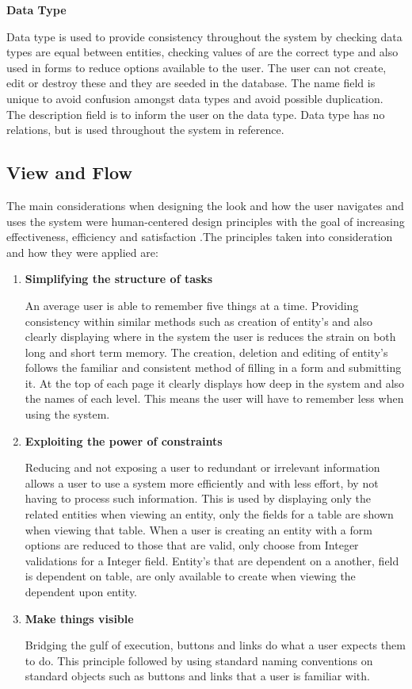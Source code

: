 \documentclass[a4paper,12pt]{article}
\begin{document}
\vspace{3mm}
\par \textbf{Data Type}
\par Data type is used to provide consistency throughout the system by checking data types are equal between entities, checking values of are the correct type and also used in forms to reduce options available to the user. The user can not create, edit or destroy these and they are seeded in the database. The name field is unique to avoid confusion amongst data types and avoid possible duplication. The description field is to inform the user on the data type. Data  type has no relations, but is used throughout the system in reference.


\subsection{View and Flow}
\par The main considerations when designing the look and how the user navigates and uses the system were human-centered design principles with the goal of increasing effectiveness, efficiency and satisfaction\cite{maguire2001methods} .The principles taken into consideration and how they were applied are\cite{abras2004user}:
\vspace{3mm}
\begin{enumerate}
\item \textbf{Simplifying the structure of tasks}
\par An average user is able to remember five things at a time. Providing consistency within similar methods such as creation of entity's and also clearly displaying where in the system the user is reduces the strain on both long and short term memory. The creation, deletion and editing of entity's follows the familiar and consistent method of filling in a form and submitting it. At the top of each page it clearly displays how deep in the system and also the names of each level. This means the user will have to remember less when using the system.
\item \textbf{Exploiting the power of constraints}
\par Reducing and not exposing a user to redundant or irrelevant information allows a user to use a system more efficiently and with less effort, by not having to process such information. This is used by displaying only the related entities when viewing an entity, only the fields for a table are shown when viewing that table. When a user is creating an entity with a form options are reduced to those that are valid, only choose from Integer validations for a Integer field. Entity's that are dependent on a another, field is dependent on table, are only available to create when viewing the dependent upon entity.
\item \textbf{Make things visible}
\par Bridging the gulf of execution, buttons and links do what a user expects them to do.  This principle followed by using standard naming conventions on standard objects such as buttons and links that a user is familiar with.
\end{enumerate}
\end{document}
